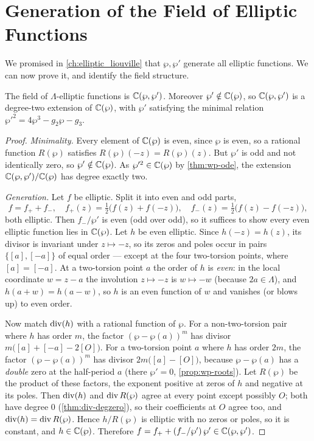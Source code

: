 \section{Generation of the Field of Elliptic Functions}
\label{sec:wp-generation}

We promised in \cref{ch:elliptic_liouville} that \(\wp, \wp'\) generate all
elliptic functions. We can now prove it, and identify the field structure.

\begin{theorem}
\label{thm:wp-generation}
The field of \(\Lambda\)-elliptic functions is \(\mathbb{C}(\wp, \wp')\). Moreover
\(\wp' \notin \mathbb{C}(\wp)\), so \(\mathbb{C}(\wp,\wp')\) is a degree-two extension of
\(\mathbb{C}(\wp)\), with \(\wp'\) satisfying the minimal relation
\(\wp'^2 = 4\wp^3 - g_2\wp - g_3\).
\end{theorem}

\begin{proof}
\emph{Minimality.} Every element of \(\mathbb{C}(\wp)\) is even, since \(\wp\) is even, so
a rational function \(R(\wp)\) satisfies \(R(\wp)(-z) = R(\wp)(z)\). But \(\wp'\)
is odd and not identically zero, so \(\wp' \notin \mathbb{C}(\wp)\). As \(\wp'^2 \in
\mathbb{C}(\wp)\) by \cref{thm:wp-ode}, the extension \(\mathbb{C}(\wp,\wp')/\mathbb{C}(\wp)\) has degree
exactly two.

\emph{Generation.} Let \(f\) be elliptic. Split it into even and odd parts,
\[
  f = f_+ + f_-, \quad
  f_+(z) = \tfrac12\bigl(f(z) + f(-z)\bigr), \quad
  f_-(z) = \tfrac12\bigl(f(z) - f(-z)\bigr),
\]
both elliptic. Then \(f_-/\wp'\) is even (odd over odd), so it suffices to show
every even elliptic function lies in \(\mathbb{C}(\wp)\). Let \(h\) be even elliptic.
Since \(h(-z) = h(z)\), its divisor is invariant under \(z \mapsto -z\), so its
zeros and poles occur in pairs \(\{[a], [-a]\}\) of equal order --- except at the
four two-torsion points, where \([a] = [-a]\). At a two-torsion point \(a\) the
order of \(h\) is \emph{even}: in the local coordinate \(w = z - a\) the
involution \(z \mapsto -z\) is \(w \mapsto -w\) (because \(2a \in \Lambda\)), and
\(h(a+w) = h(a-w)\), so \(h\) is an even function of \(w\) and vanishes (or blows
up) to even order.

Now match \(\operatorname{div}(h)\) with a rational function of \(\wp\). For a
non-two-torsion pair where \(h\) has order \(m\), the factor
\((\wp - \wp(a))^{m}\) has divisor \(m\bigl([a] + [-a] - 2[O]\bigr)\). For a
two-torsion point \(a\) where \(h\) has order \(2m\), the factor
\((\wp - \wp(a))^{m}\) has divisor \(2m\bigl([a] - [O]\bigr)\), because
\(\wp - \wp(a)\) has a \emph{double} zero at the half-period \(a\) (there
\(\wp' = 0\), \cref{prop:wp-roots}). Let \(R(\wp)\) be the product of these
factors, the exponent positive at zeros of \(h\) and negative at its poles. Then
\(\operatorname{div}(h)\) and \(\operatorname{div} R(\wp)\) agree at every point except possibly
\(O\); both have degree \(0\) (\cref{thm:div-degzero}), so their coefficients at
\(O\) agree too, and \(\operatorname{div}(h) = \operatorname{div} R(\wp)\). Hence \(h/R(\wp)\) is
elliptic with no zeros or poles, so it is constant, and \(h \in \mathbb{C}(\wp)\).
Therefore \(f = f_+ + (f_-/\wp')\,\wp' \in \mathbb{C}(\wp,\wp')\).
\end{proof}

